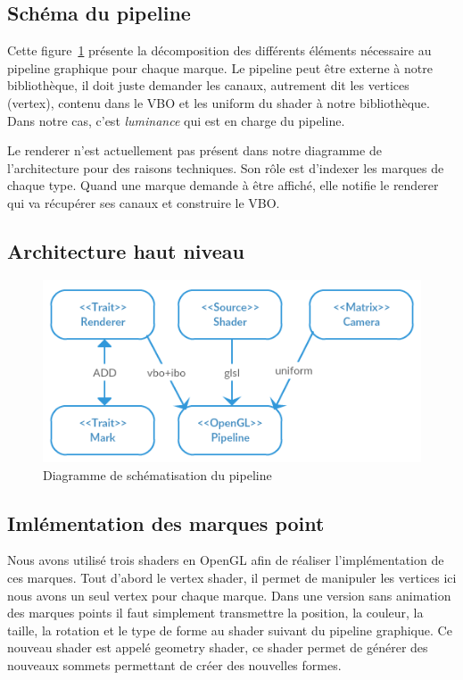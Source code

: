\documentclass[12pt]{article}
\begin{document}
\subsection{Schéma du pipeline} %

Cette figure~\ref{fig:pipe} présente la décomposition des différents éléments nécessaire au \gls{pipeline}
graphique pour chaque marque. Le pipeline peut être externe à notre bibliothèque, il doit juste demander
les canaux, autrement dit les vertices (\gls{vertex}), contenu dans le \gls{VBO} et les \gls{uniform}
du \gls{shader} à notre bibliothèque\cite{Semi}.
Dans notre cas, c'est \textit{luminance} \cite{luminance} qui est en charge du pipeline.

Le renderer n'est actuellement pas présent dans notre diagramme de l'architecture pour des
raisons techniques. Son rôle est d'indexer les marques de chaque type. Quand une marque demande
à être affiché, elle notifie le renderer qui va récupérer ses canaux et construire le VBO.

\subsection{Architecture haut niveau}


\begin{figure}[htp]
  \centering
  \includegraphics[scale=0.8]{images/pipeline}
  \caption{Diagramme de schématisation du pipeline}
  \label{fig:pipe}
\end{figure}


\subsection{Imlémentation des marques point}

Nous avons utilisé trois shaders en OpenGL afin de réaliser l'implémentation de ces marques. Tout d'abord le vertex shader, il permet de manipuler les vertices ici nous avons un seul vertex pour chaque marque. Dans une version sans animation des marques points il faut simplement transmettre la position, la couleur, la taille, la rotation et le type de forme au shader suivant du pipeline graphique. Ce nouveau shader est appelé geometry shader, ce shader permet de générer des nouveaux sommets permettant de créer des nouvelles formes.
\end{document}
